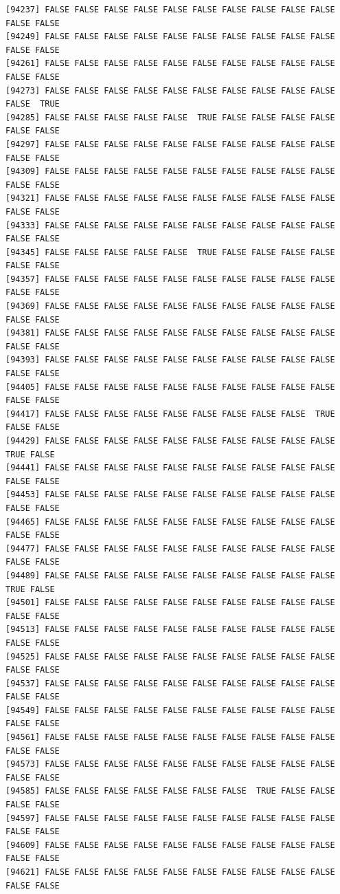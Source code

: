 \documentclass[
  a4paper,
  DIV=11,
  numbers=noendperiod]{scrartcl}
\begin{document}
\begin{verbatim}
[94237] FALSE FALSE FALSE FALSE FALSE FALSE FALSE FALSE FALSE FALSE FALSE FALSE
[94249] FALSE FALSE FALSE FALSE FALSE FALSE FALSE FALSE FALSE FALSE FALSE FALSE
[94261] FALSE FALSE FALSE FALSE FALSE FALSE FALSE FALSE FALSE FALSE FALSE FALSE
[94273] FALSE FALSE FALSE FALSE FALSE FALSE FALSE FALSE FALSE FALSE FALSE  TRUE
[94285] FALSE FALSE FALSE FALSE FALSE  TRUE FALSE FALSE FALSE FALSE FALSE FALSE
[94297] FALSE FALSE FALSE FALSE FALSE FALSE FALSE FALSE FALSE FALSE FALSE FALSE
[94309] FALSE FALSE FALSE FALSE FALSE FALSE FALSE FALSE FALSE FALSE FALSE FALSE
[94321] FALSE FALSE FALSE FALSE FALSE FALSE FALSE FALSE FALSE FALSE FALSE FALSE
[94333] FALSE FALSE FALSE FALSE FALSE FALSE FALSE FALSE FALSE FALSE FALSE FALSE
[94345] FALSE FALSE FALSE FALSE FALSE  TRUE FALSE FALSE FALSE FALSE FALSE FALSE
[94357] FALSE FALSE FALSE FALSE FALSE FALSE FALSE FALSE FALSE FALSE FALSE FALSE
[94369] FALSE FALSE FALSE FALSE FALSE FALSE FALSE FALSE FALSE FALSE FALSE FALSE
[94381] FALSE FALSE FALSE FALSE FALSE FALSE FALSE FALSE FALSE FALSE FALSE FALSE
[94393] FALSE FALSE FALSE FALSE FALSE FALSE FALSE FALSE FALSE FALSE FALSE FALSE
[94405] FALSE FALSE FALSE FALSE FALSE FALSE FALSE FALSE FALSE FALSE FALSE FALSE
[94417] FALSE FALSE FALSE FALSE FALSE FALSE FALSE FALSE FALSE  TRUE FALSE FALSE
[94429] FALSE FALSE FALSE FALSE FALSE FALSE FALSE FALSE FALSE FALSE  TRUE FALSE
[94441] FALSE FALSE FALSE FALSE FALSE FALSE FALSE FALSE FALSE FALSE FALSE FALSE
[94453] FALSE FALSE FALSE FALSE FALSE FALSE FALSE FALSE FALSE FALSE FALSE FALSE
[94465] FALSE FALSE FALSE FALSE FALSE FALSE FALSE FALSE FALSE FALSE FALSE FALSE
[94477] FALSE FALSE FALSE FALSE FALSE FALSE FALSE FALSE FALSE FALSE FALSE FALSE
[94489] FALSE FALSE FALSE FALSE FALSE FALSE FALSE FALSE FALSE FALSE  TRUE FALSE
[94501] FALSE FALSE FALSE FALSE FALSE FALSE FALSE FALSE FALSE FALSE FALSE FALSE
[94513] FALSE FALSE FALSE FALSE FALSE FALSE FALSE FALSE FALSE FALSE FALSE FALSE
[94525] FALSE FALSE FALSE FALSE FALSE FALSE FALSE FALSE FALSE FALSE FALSE FALSE
[94537] FALSE FALSE FALSE FALSE FALSE FALSE FALSE FALSE FALSE FALSE FALSE FALSE
[94549] FALSE FALSE FALSE FALSE FALSE FALSE FALSE FALSE FALSE FALSE FALSE FALSE
[94561] FALSE FALSE FALSE FALSE FALSE FALSE FALSE FALSE FALSE FALSE FALSE FALSE
[94573] FALSE FALSE FALSE FALSE FALSE FALSE FALSE FALSE FALSE FALSE FALSE FALSE
[94585] FALSE FALSE FALSE FALSE FALSE FALSE FALSE  TRUE FALSE FALSE FALSE FALSE
[94597] FALSE FALSE FALSE FALSE FALSE FALSE FALSE FALSE FALSE FALSE FALSE FALSE
[94609] FALSE FALSE FALSE FALSE FALSE FALSE FALSE FALSE FALSE FALSE FALSE FALSE
[94621] FALSE FALSE FALSE FALSE FALSE FALSE FALSE FALSE FALSE FALSE FALSE FALSE

\end{verbatim}
\end{document}
